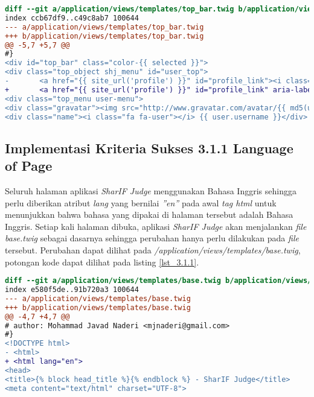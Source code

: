\begin{itemize}
\begin{lstlisting}[language=diff, caption=Perubahan untuk mematuhi kriteria 2.4.4, label=lst_2.4.4, basicstyle=\ttfamily, frame=single,
columns=fullflexible, keepspaces=true, breaklines=true]
diff --git a/application/views/templates/top_bar.twig b/application/views/templates/top_bar.twig
index ccb67df9..c49c8ab7 100644
--- a/application/views/templates/top_bar.twig
+++ b/application/views/templates/top_bar.twig
@@ -5,7 +5,7 @@
#}
<div id="top_bar" class="color-{{ selected }}">
<div class="top_object shj_menu" id="user_top">
- 		<a href="{{ site_url('profile') }}" id="profile_link"><i class="fa fa-user"></i></a>
+ 		<a href="{{ site_url('profile') }}" id="profile_link" aria-label="Profile"><i class="fa fa-user"></i></a>
<div class="top_menu user-menu">
<div class="gravatar"><img src="http://www.gravatar.com/avatar/{{ md5(user.email) }}?s=70&d=identicon" /></div>
<div class="name"><i class="fa fa-user"></i> {{ user.username }}</div>
\end{lstlisting}

\end{itemize}

\subsection{Implementasi Kriteria Sukses 3.1.1 Language of Page}
\label{subsec:implementasi_A_3.1.1}

Seluruh halaman aplikasi \textit{SharIF Judge} menggunakan Bahasa Inggris sehingga perlu diberikan atribut \textit{lang} yang bernilai \textit{''en''} pada awal \textit{tag html} untuk menunjukkan bahwa bahasa yang dipakai di halaman tersebut adalah Bahasa Inggris. Setiap kali halaman dibuka, aplikasi \textit{SharIF Judge} akan menjalankan \textit{file} \textit{base.twig} sebagai dasarnya sehingga perubahan hanya perlu dilakukan pada \textit{file} tersebut. Perubahan dapat dilihat pada \textit{/application/views/templates/base.twig}, potongan kode dapat dilihat pada listing \ref{lst_3.1.1}.

\begin{lstlisting}[language=diff, caption=Perubahan untuk mematuhi kriteria 3.1.1, label=lst_3.1.1, basicstyle=\ttfamily, frame=single,
columns=fullflexible, keepspaces=true, breaklines=true]
diff --git a/application/views/templates/base.twig b/application/views/templates/base.twig
index e580f5de..91b720a3 100644
--- a/application/views/templates/base.twig
+++ b/application/views/templates/base.twig
@@ -4,7 +4,7 @@
# author: Mohammad Javad Naderi <mjnaderi@gmail.com>
#}
<!DOCTYPE html>
- <html>
+ <html lang="en">
<head>
<title>{% block head_title %}{% endblock %} - SharIF Judge</title>
<meta content="text/html" charset="UTF-8">
\end{lstlisting}

